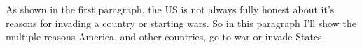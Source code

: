 As shown in the first paragraph, the US is not always fully honest about it's reasons for invading a country or starting wars. So in this paragraph I'll show the multiple reasons America, and other countries, go to war or invade States.


